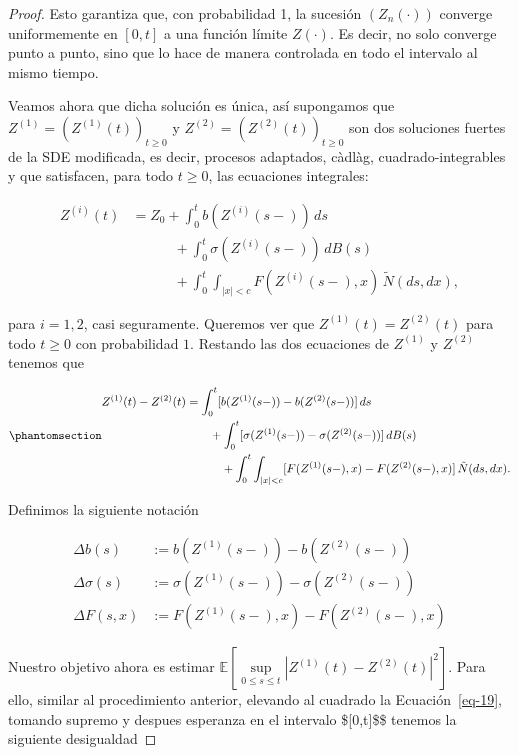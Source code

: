 \documentclass[
  spanish,
  us-letterpaper,
]{scrreprt}
\theoremstyle{plain}
\theoremstyle{plain}
\theoremstyle{plain}
\theoremstyle{definition}
\theoremstyle{remark}
\begin{document}
\begin{proof}
Esto garantiza que, con probabilidad 1, la sucesión \((Z_n(\cdot))\)
converge uniformemente en \([0,t]\) a una función límite \(Z(\cdot)\).
Es decir, no solo converge punto a punto, sino que lo hace de manera
controlada en todo el intervalo al mismo tiempo.

Veamos ahora que dicha solución es única, así supongamos que
\(Z^{(1)}= (Z^{(1)}(t))_{t \geq 0}\) y
\(Z^{(2)} = (Z^{(2)}(t))_{t \geq 0}\) son dos soluciones fuertes de la
SDE modificada, es decir, procesos adaptados, càdlàg,
cuadrado-integrables y que satisfacen, para todo \(t \geq 0\), las
ecuaciones integrales:

\[
    \begin{aligned}
        Z^{(i)}(t) & = Z_0 + \int_0^t b(Z^{(i)}(s-))\,ds\\ 
        & \qquad \quad + \int_0^t \sigma(Z^{(i)}(s-))\,dB(s)\\ 
        & \qquad\quad + \int_0^t \int_{|x|<c} F(Z^{(i)}(s-), x)\,\tilde{N}(ds,dx),
    \end{aligned}
\]

para \(i=1,2\), casi seguramente. Queremos ver que
\(Z^{(1)}(t) = Z^{(2)}(t)\) para todo \(t\geq 0\) con probabilidad
\(1\). Restando las dos ecuaciones de \(Z^{(1)}\) y \(Z^{(2)}\) tenemos
que

\begin{equation}\phantomsection\label{eq-19}{
    \begin{aligned}
        Z^{(1)}(t) - Z^{(2)}(t) & = \int_0^t [b(Z^{(1)}(s-)) - b(Z^{(2)}(s-))]\,ds\\ 
        & \qquad + \int_0^t [\sigma(Z^{(1)}(s-)) - \sigma(Z^{(2)}(s-))]\,dB(s)\\ 
        & \qquad\quad + \int_0^t \int_{|x|<c} [F(Z^{(1)}(s-), x) - F(Z^{(2)}(s-), x)]\,\tilde{N}(ds,dx). 
    \end{aligned}
}\end{equation}

Definimos la siguiente notación

\[
    \begin{aligned}
        \Delta b(s) & :=b(Z^{(1)}(s-))-b(Z^{(2)}(s-))\\ 
        \Delta \sigma(s) & := \sigma(Z^{(1)}(s-))-\sigma(Z^{(2)}(s-))\\ 
        \Delta F(s,x) & := F(Z^{(1)}(s-),x)-F(Z^{(2)}(s-),x)
    \end{aligned}
\]

Nuestro objetivo ahora es estimar
\(\displaystyle \mathbb{E}\left[\sup\limits_{0\leq s\leq t}|Z^{(1)}(t) - Z^{(2)}(t)|^2\right]\).
Para ello, similar al procedimiento anterior, elevando al cuadrado la
Ecuación~\ref{eq-19}, tomando supremo y despues esperanza en el
intervalo \${[}0,t{]}\$\$ tenemos la siguiente desigualdad


\end{proof}
\end{document}
